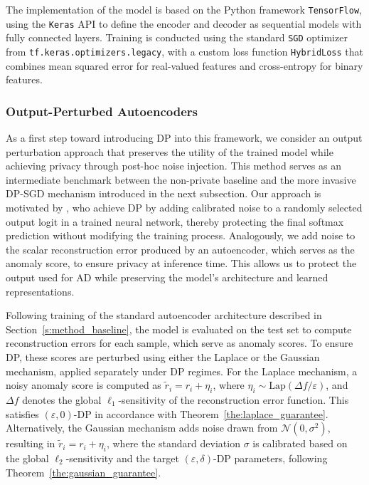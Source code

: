 The implementation of the model is based on the Python framework \texttt{TensorFlow}, using the \texttt{Keras} API to define the encoder and decoder as sequential models with fully connected layers. Training is conducted using the standard \texttt{SGD} optimizer from \texttt{tf.keras.optimizers.legacy}, with a custom loss function \texttt{HybridLoss} that combines mean squared error for real-valued features and cross-entropy for binary features.

\subsubsection{Output-Perturbed Autoencoders}

As a first step toward introducing DP into this framework, we consider an output perturbation approach that preserves the utility of the trained model while achieving privacy through post-hoc noise injection. This method serves as an intermediate benchmark between the non-private baseline and the more invasive DP-SGD mechanism introduced in the next subsection. Our approach is motivated by \citet{lu2022differentially}, who achieve DP by adding calibrated noise to a randomly selected output logit in a trained neural network, thereby protecting the final softmax prediction without modifying the training process. Analogously, we add noise to the scalar reconstruction error produced by an autoencoder, which serves as the anomaly score, to ensure privacy at inference time. This allows us to protect the output used for AD while preserving the model’s architecture and learned representations.

Following training of the standard autoencoder architecture described in Section~\ref{s:method_baseline}, the model is evaluated on the test set to compute reconstruction errors for each sample, which serve as anomaly scores. To ensure DP, these scores are perturbed using either the Laplace or the Gaussian mechanism, applied separately under DP regimes. For the Laplace mechanism, a noisy anomaly score is computed as \(\tilde{r}_i = r_i + \eta_i\), where \(\eta_i \sim \mathrm{Lap}(\Delta f / \varepsilon)\), and \(\Delta f\) denotes the global \(\ell_1\)-sensitivity of the reconstruction error function. This satisfies \((\varepsilon, 0)\)-DP in accordance with Theorem~\ref{the:laplace_guarantee}. Alternatively, the Gaussian mechanism adds noise drawn from \(\mathcal{N}(0, \sigma^2)\), resulting in \(\tilde{r}_i = r_i + \eta_i\), where the standard deviation \(\sigma\) is calibrated based on the global \(\ell_2\)-sensitivity and the target \((\varepsilon, \delta)\)-DP parameters, following Theorem~\ref{the:gaussian_guarantee}.

